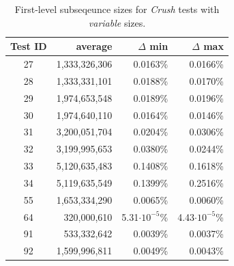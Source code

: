 \documentclass[
  digital,     %
  oneside,     %
  nosansbold,  %
  nocolorbold, %
  nolof,         %
  nolot,         %
]{fithesis4}
\begin{document}
\begin{table}[H]
  \begin{tabularx}{0.75\textwidth}{c|r|r|r}
    Test ID & average & $\Delta$ min & $\Delta$ max\\
    \midrule
    27&1,333,326,306&0.0163\%&0.0166\%\\
    28&1,333,331,101&0.0188\%&0.0170\%\\	
    29&1,974,653,548&0.0189\%&0.0196\%	\\
    30&1,974,640,110&0.0164\%&0.0146\%	\\
    31&3,200,051,704&0.0204\%&0.0306\%	\\
    32&3,199,995,653&0.0380\%&0.0244\%	\\
    33&5,120,635,483&0.1408\%&0.1618\%	\\
    34&5,119,635,549&0.1399\%&0.2516\%	\\
    55&1,653,334,290&0.0065\%&0.0060\%	\\
    64&320,000,610&5.31$\cdot10^{-5}$\% &4.43$\cdot10^{-5}$\%\\
    91&533,332,642&0.0039\%&0.0037\%	\\
    92&1,599,996,811&0.0049\%&0.0043\%\\

  \end{tabularx}
  \caption{First-level subseqeunce sizes for \emph{Crush} tests with \emph{variable} sizes.}
  \label{tab:analysis_crush_variable}
\end{table}
\end{document}
